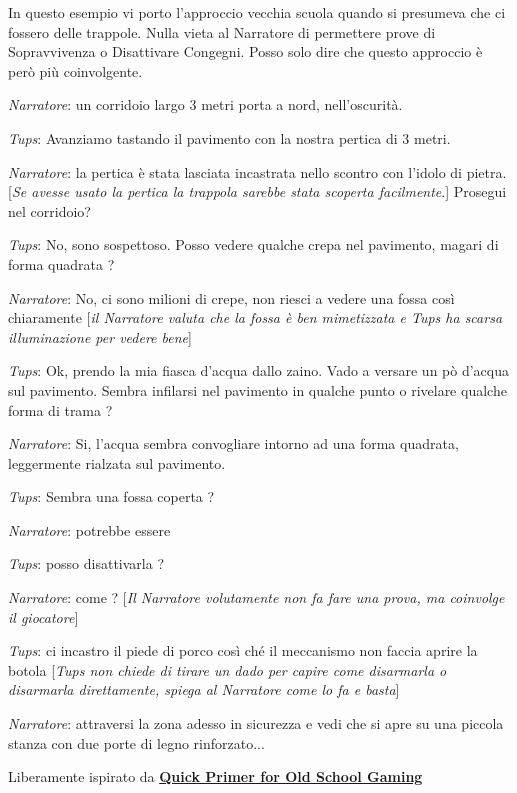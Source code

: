 \begin{changemargin}{0.3cm}{0.3cm}\begin{tcolorbox}[title = Tups e la trappola]
In questo esempio vi porto l'approccio vecchia scuola quando si presumeva che ci fossero delle trappole. Nulla vieta al Narratore di permettere prove di Sopravvivenza o Disattivare Congegni. Posso solo dire che questo approccio è però più coinvolgente.

\bigskip

\emph{Narratore}: un corridoio largo 3 metri porta a nord, nell'oscurità.

\emph{Tups}: Avanziamo tastando il pavimento con la nostra pertica di 3 metri.

\emph{Narratore}: la pertica è stata lasciata incastrata nello scontro con l'idolo di pietra.
[\emph{Se avesse usato la pertica la trappola sarebbe stata scoperta facilmente}.]
Prosegui nel corridoio?

\emph{Tups}: No, sono sospettoso. Posso vedere qualche crepa nel pavimento, magari di forma quadrata ?

\emph{Narratore}: No, ci sono milioni di crepe, non riesci a vedere una fossa così chiaramente [\emph{il Narratore valuta che la fossa è ben mimetizzata e Tups ha scarsa illuminazione per vedere bene}]

\emph{Tups}: Ok, prendo la mia fiasca d'acqua dallo zaino. Vado a versare un pò d'acqua sul pavimento. Sembra infilarsi nel pavimento in qualche punto o rivelare qualche forma di trama ?

\emph{Narratore}: Si, l'acqua sembra convogliare intorno ad una forma quadrata, leggermente rialzata sul pavimento.

\emph{Tups}: Sembra una fossa coperta ?

\emph{Narratore}: potrebbe essere

\emph{Tups}: posso disattivarla ?

\emph{Narratore}: come ? [\emph{Il Narratore volutamente non fa fare una prova, ma coinvolge il giocatore}]

\emph{Tups}: ci incastro il piede di porco così ché il meccanismo non faccia aprire la botola [\emph{Tups non chiede di tirare un dado per capire come disarmarla o disarmarla direttamente, spiega al Narratore come lo fa e basta}]

\emph{Narratore}: attraversi la zona adesso in sicurezza e vedi che si apre su una piccola stanza con due porte di legno rinforzato...

\medskip

Liberamente ispirato da \href{https://friendorfoe.com/d/Old%20School%20Primer.pdf}{ \textbf{Quick Primer for Old School Gaming}}

\end{tcolorbox}\end{changemargin}

